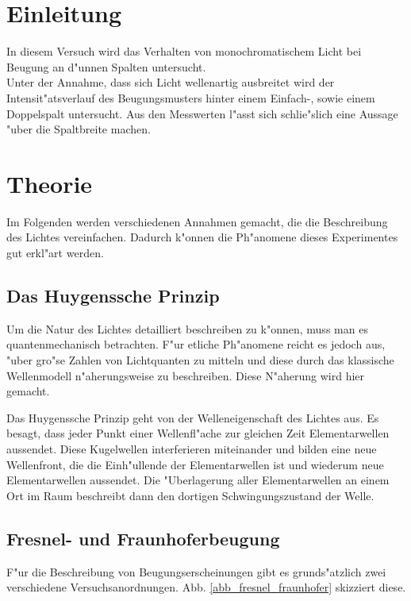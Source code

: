 \section{Einleitung}
	\label{sec:einleitung}
	In diesem Versuch wird das Verhalten von monochromatischem Licht bei Beugung an d"unnen Spalten untersucht.\\
	Unter der Annahme, dass sich Licht wellenartig ausbreitet wird der Intensit"atsverlauf des Beugungsmusters hinter einem Einfach-, sowie einem Doppelspalt untersucht.
	Aus den Messwerten l"asst sich schlie"slich eine Aussage "uber die Spaltbreite machen.

\section{Theorie}
	\label{sec:theorie}

	Im Folgenden werden verschiedenen Annahmen gemacht, die die Beschreibung des Lichtes vereinfachen.
	Dadurch k"onnen die Ph"anomene dieses Experimentes gut erkl"art werden.

	\subsection{Das Huygenssche Prinzip}

		Um die Natur des Lichtes detailliert beschreiben zu k"onnen, muss man es quan\-ten\-me\-cha\-nisch betrachten.
		F"ur etliche Ph"anomene reicht es jedoch aus, "uber gro"se Zahlen von Lichtquanten zu mitteln und diese durch das klassische Wellenmodell n"aherungsweise zu beschreiben.
		Diese N"aherung wird hier gemacht.

		Das Huygenssche Prinzip geht von der Welleneigenschaft des Lichtes aus.
		Es besagt, dass jeder Punkt einer Wellenfl"ache zur gleichen Zeit Elementarwellen aussendet.
		Diese Kugelwellen interferieren miteinander und bilden eine neue Wellenfront,
		die die Ein\-h"ul\-len\-de der Elementarwellen ist und wiederum neue Elementarwellen aussendet.
		Die "Uberlagerung aller Elementarwellen an einem Ort im Raum beschreibt dann den dortigen Schwingungszustand der Welle.

	\subsection{Fresnel- und Fraunhoferbeugung}
		\label{subsec:beugung}

		F"ur die Beschreibung von Beugungserscheinungen gibt es grunds"atzlich zwei verschiedene Versuchsanordnungen. Abb. \ref{abb_fresnel_fraunhofer} skizziert diese.

